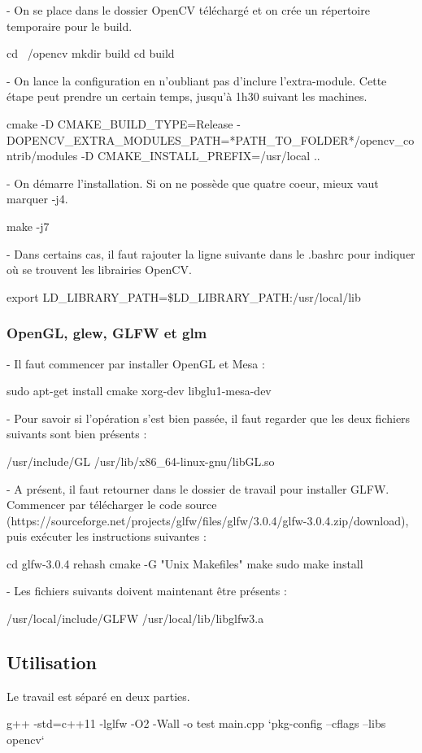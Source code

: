- On se place dans le dossier OpenCV téléchargé et on crée un répertoire temporaire pour le build.

cd ~/opencv
mkdir build
cd build

- On lance la configuration en n'oubliant pas d'inclure l'extra-module. Cette étape peut prendre un certain temps, jusqu'à 1h30 suivant les machines.

cmake -D CMAKE_BUILD_TYPE=Release -DOPENCV_EXTRA_MODULES_PATH=*PATH_TO_FOLDER*/opencv_contrib/modules -D CMAKE_INSTALL_PREFIX=/usr/local ..

- On démarre l'installation. Si on ne possède que quatre coeur, mieux vaut marquer -j4.

make -j7

- Dans certains cas, il faut rajouter la ligne suivante dans le .bashrc pour indiquer où se trouvent les librairies OpenCV.

export LD_LIBRARY_PATH=\$LD_LIBRARY_PATH:/usr/local/lib



\subsubsection{OpenGL, glew, GLFW et glm}

- Il faut commencer par installer OpenGL et Mesa :

sudo apt-get install cmake xorg-dev libglu1-mesa-dev

- Pour savoir si l'opération s'est bien passée, il faut regarder que les deux fichiers suivants sont bien présents :

/usr/include/GL
/usr/lib/x86_64-linux-gnu/libGL.so

- A présent, il faut retourner dans le dossier de travail pour installer GLFW. Commencer par télécharger le code source (https://sourceforge.net/projects/glfw/files/glfw/3.0.4/glfw-3.0.4.zip/download), puis exécuter les instructions suivantes :

cd glfw-3.0.4
rehash
cmake -G "Unix Makefiles"
make
sudo make install

- Les fichiers suivants doivent maintenant être présents :

/usr/local/include/GLFW
/usr/local/lib/libglfw3.a

\subsection{Utilisation}

Le travail est séparé en deux parties.

g++ -std=c++11 -lglfw -O2 -Wall -o test main.cpp `pkg-config --cflags --libs opencv` 